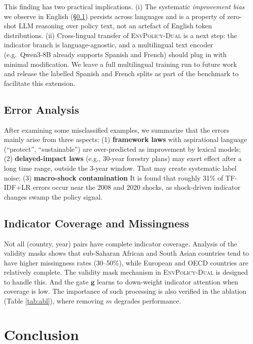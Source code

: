 \documentclass[11pt]{article}
\newcommand{\ours}{\textsc{EnvPolicy-Dual}}
\begin{document}
This finding has two practical implications. (i) The systematic
\emph{improvement bias} we observe in English (\S\ref{sec:err}) persists across languages and is a property of zero-shot LLM reasoning over policy text, not an artefact of English token distributions. (ii) Cross-lingual transfer of \ours{} is a next step: the indicator branch is language-agnostic, and a multilingual text encoder (e.g.\ Qwen3-8B already supports Spanish and French) should plug in with minimal modification. We leave a full multilingual training run to future work and release the labelled Spanish and French splits as part of the benchmark to facilitate this extension.


\subsection{Error Analysis}
\label{sec:err}

After examining some misclassified examples, we summarize that the errors mainly arise from three aspects:
(1) \textbf{framework laws} with aspirational language (``protect'', ``sustainable'') are over-predicted as \textsf{improvement} by lexical models;
(2) \textbf{delayed-impact laws} (e.g., 30-year forestry plans) may exert effect after a long time range, outside the 3-year window. That may create systematic label noise;
(3) \textbf{macro-shock contamination} It is found that roughly 31\% of TF-IDF+LR errors occur near the 2008 and 2020 shocks, as shock-driven indicator changes swamp the policy signal.


\subsection{Indicator Coverage and Missingness}

Not all (country, year) pairs have complete indicator coverage. Analysis of the validity masks shows that sub-Saharan African and South Asian countries tend to have higher missingness rates (30--50\%), while European and OECD countries are relatively complete. The validity mask mechanism in \ours{} is designed to handle this.  And the gate $\mathbf{g}$ learns to down-weight indicator attention when coverage is low. The importance of such processing is also verified in the ablation (Table \ref{tab:abl}), where removing $m$ degrades performance.

\section{Conclusion}
\label{sec:conclusion}
\end{document}
